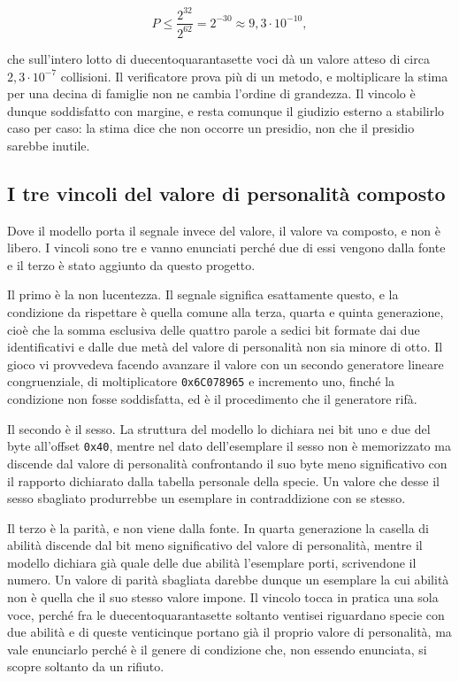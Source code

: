 \[
P \le \frac{2^{32}}{2^{62}} = 2^{-30} \approx 9{,}3 \cdot 10^{-10},
\]

che sull'intero lotto di duecentoquarantasette voci dà un valore atteso di circa $2{,}3 \cdot 10^{-7}$ collisioni. Il verificatore prova più di un metodo, e moltiplicare la stima per una decina di famiglie non ne cambia l'ordine di grandezza. Il vincolo è dunque soddisfatto con margine, e resta comunque il giudizio esterno a stabilirlo caso per caso: la stima dice che non occorre un presidio, non che il presidio sarebbe inutile.

\subsection{I tre vincoli del valore di personalità composto}

Dove il modello porta il segnale invece del valore, il valore va composto, e non è libero. I vincoli sono tre e vanno enunciati perché due di essi vengono dalla fonte e il terzo è stato aggiunto da questo progetto.

Il primo è la non lucentezza. Il segnale significa esattamente questo, e la condizione da rispettare è quella comune alla terza, quarta e quinta generazione, cioè che la somma esclusiva delle quattro parole a sedici bit formate dai due identificativi e dalle due metà del valore di personalità non sia minore di otto. Il gioco vi provvedeva facendo avanzare il valore con un secondo generatore lineare congruenziale, di moltiplicatore \texttt{0x6C078965} e incremento uno, finché la condizione non fosse soddisfatta, ed è il procedimento che il generatore rifà.

Il secondo è il sesso. La struttura del modello lo dichiara nei bit uno e due del byte all'offset \texttt{0x40}, mentre nel dato dell'esemplare il sesso non è memorizzato ma discende dal valore di personalità confrontando il suo byte meno significativo con il rapporto dichiarato dalla tabella personale della specie. Un valore che desse il sesso sbagliato produrrebbe un esemplare in contraddizione con se stesso.

Il terzo è la parità, e non viene dalla fonte. In quarta generazione la casella di abilità discende dal bit meno significativo del valore di personalità, mentre il modello dichiara già quale delle due abilità l'esemplare porti, scrivendone il numero. Un valore di parità sbagliata darebbe dunque un esemplare la cui abilità non è quella che il suo stesso valore impone. Il vincolo tocca in pratica una sola voce, perché fra le duecentoquarantasette soltanto ventisei riguardano specie con due abilità e di queste venticinque portano già il proprio valore di personalità, ma vale enunciarlo perché è il genere di condizione che, non essendo enunciata, si scopre soltanto da un rifiuto.

